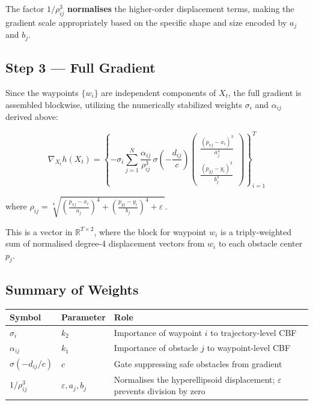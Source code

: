 \documentclass{article}
\newcommand{\sigmoid}{\sigma}
\begin{document}
The factor $1/\rho_{ij}^3$ \textbf{normalises} the higher-order displacement terms, making the gradient scale appropriately based on the specific shape and size encoded by $a_j$ and $b_j$.

\subsection*{Step 3 --- Full Gradient}

Since the waypoints $\{w_i\}$ are independent components of $X_t$,
the full gradient is assembled blockwise, utilizing the numerically
stabilized weights $\sigma_i$ and $\alpha_{ij}$ derived above:

\begin{equation}
\boxed{
    \nabla_{X_t} h(X_t)
    = \left\{
        -\sigma_i \sum_{j=1}^{N} \frac{\alpha_{ij}}{\rho_{ij}^3}\,
        \sigmoid\!\left(-\frac{d_{ij}}{c}\right)
        \begin{pmatrix} \frac{(p_{xj} - x_i)^3}{a_j^4} \\ \frac{(p_{yj} - y_i)^3}{b_j^4} \end{pmatrix}
      \right\}_{i=1}^{T}
}
\end{equation}

where $\rho_{ij} = \sqrt[4]{\left(\frac{p_{xj} - x_i}{a_j}\right)^4 + \left(\frac{p_{yj} - y_i}{b_j}\right)^4 + \varepsilon\,}$.

This is a vector in $\mathbb{R}^{T \times 2}$, where the block for waypoint $w_i$
is a triply-weighted sum of normalised degree-4 displacement vectors
from $w_i$ to each obstacle center $p_j$.

\subsection*{Summary of Weights}

\begin{center}
\begin{tabular}{lll}
\toprule
\textbf{Symbol} & \textbf{Parameter} & \textbf{Role} \\
\midrule
$\sigma_i$ & $k_2$ & Importance of waypoint $i$ to trajectory-level CBF \\
$\alpha_{ij}$ & $k_1$ & Importance of obstacle $j$ to waypoint-level CBF \\
$\sigmoid(-d_{ij}/c)$ & $c$ & Gate suppressing safe obstacles from gradient \\
$1/\rho_{ij}^3$ & $\varepsilon, a_j, b_j$ & Normalises the hyperellipsoid displacement; $\varepsilon$ prevents division by zero \\
\bottomrule
\end{tabular}
\end{center}
\end{document}
